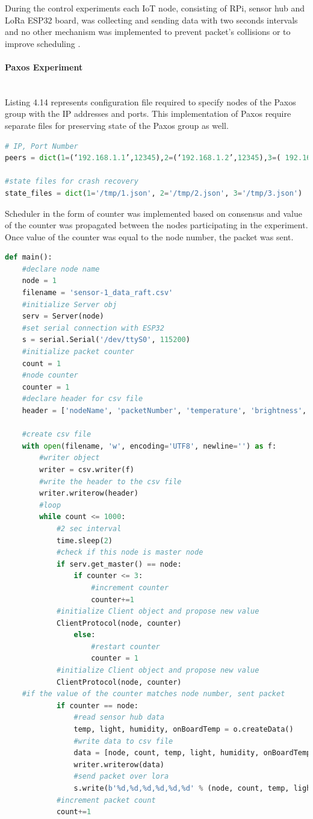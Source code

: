\documentclass[oneside,12pt]{book}
\newcommand{\myparagraph}[1]{\paragraph{#1}\mbox{}\\}
\begin{document}
During the control experiments each IoT node, consisting of RPi, sensor hub and LoRa ESP32 board, was collecting and sending data with two seconds intervals and no other mechanism was implemented to prevent packet’s collisions \citep{s21041193} or to improve scheduling \citep{scheduling}. 
\myparagraph{Paxos Experiment}
Listing 4.14 represents configuration file required to specify nodes of the Paxos group with the IP addresses and ports. This implementation of Paxos require separate files for preserving state of the Paxos group as well.
\begin{lstlisting}[language=Python, caption=Paxos configuration file - Python3,captionpos=b ]
# IP, Port Number
peers = dict(1=(‘192.168.1.1’,12345),2=(‘192.168.1.2’,12345),3=( 192.168.1.3’,12345))

#state files for crash recovery
state_files = dict(1='/tmp/1.json', 2='/tmp/2.json', 3='/tmp/3.json')
\end{lstlisting}
Scheduler in the form of counter was implemented based on consensus and value of the counter was propagated between the nodes participating in the experiment. Once value of the counter was equal to the node number, the packet was sent.
\begin{lstlisting}[language=Python, caption=Paxos experiment Raspberry Pi code - Python3,captionpos=b ]
def main():
    #declare node name
    node = 1
    filename = 'sensor-1_data_raft.csv'
    #initialize Server obj
    serv = Server(node)
    #set serial connection with ESP32
    s = serial.Serial('/dev/ttyS0', 115200)
    #initialize packet counter
    count = 1
    #node counter
    counter = 1
    #declare header for csv file
    header = ['nodeName', 'packetNumber', 'temperature', 'brightness', 'humidity', 'onBoardTemp']  
   
    #create csv file
    with open(filename, 'w', encoding='UTF8', newline='') as f:
        #writer object
        writer = csv.writer(f)
        #write the header to the csv file
        writer.writerow(header)
        #loop 
        while count <= 1000:
            #2 sec interval
            time.sleep(2)
            #check if this node is master node			 
            if serv.get_master() == node:
                if counter <= 3:
                    #increment counter				
                    counter+=1
	        #initialize Client object and propose new value
	        ClientProtocol(node, counter)
                else:
                    #restart counter
                    counter = 1
	        #initialize Client object and propose new value
	        ClientProtocol(node, counter)
	#if the value of the counter matches node number, sent packet		
            if counter == node:
                #read sensor hub data
                temp, light, humidity, onBoardTemp = o.createData()
                #write data to csv file
                data = [node, count, temp, light, humidity, onBoardTemp]
                writer.writerow(data)
                #send packet over lora
                s.write(b'%d,%d,%d,%d,%d,%d' % (node, count, temp, light, humidity, onBoardTemp)) 
            #increment packet count
            count+=1
\end{lstlisting}
\end{document}
